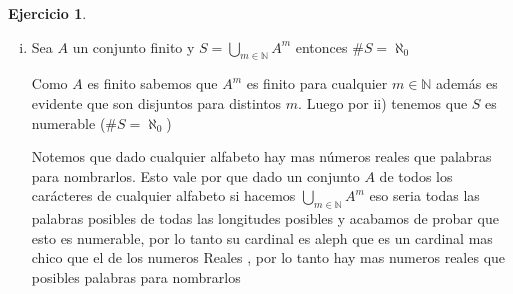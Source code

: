 \documentclass[12pt]{article}
\newcommand{\n}{\aleph_{0}}
\newcommand{\N}{\mathbb{N}}
\theoremstyle{definition}
\newtheorem{ej}{Ejercicio}
\begin{document}
\begin{ej}
\begin{enumerate}[i.]
  \item Sea $A$ un conjunto finito y $S = \bigcup_{m \in \N} A^{m}$ entonces $\# S = \n$  

  Como $A$ es finito sabemos que $A^m$ es finito para cualquier $m \in \N$ además es evidente que son disjuntos para distintos $m$. Luego por ii) tenemos que $S$ es numerable ($\# S = \n$)

Notemos que dado cualquier alfabeto hay mas números reales que palabras para nombrarlos. Esto vale por que dado un conjunto $A$ de todos los carácteres de cualquier alfabeto si hacemos $\bigcup_{m \in \N}A^{m}$ eso seria todas las palabras posibles de todas las longitudes posibles y acabamos de probar que esto es numerable, por lo tanto su cardinal es aleph que es un cardinal mas chico que el de los numeros Reales , por lo tanto hay mas numeros reales que posibles palabras para nombrarlos
\end{enumerate}
\end{ej}
\end{document}
